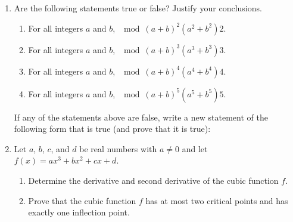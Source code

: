 \begin{enumerate}
\item Are the following statements true or false?  Justify your conclusions.
\begin{enumerate}
  \item For all integers $a$ and $b$, $\mod{(a + b)^2}{\left(a^2 + b^2 \right)}{2}$.
  \item For all integers $a$ and $b$, $\mod{(a + b)^3}{\left(a^3 + b^3 \right)}{3}$.
  \item For all integers $a$ and $b$, $\mod{(a + b)^4}{\left(a^4 + b^4 \right)}{4}$.
  \item For all integers $a$ and $b$, $\mod{(a + b)^5}{\left(a^5 + b^5 \right)}{5}$.
\end{enumerate}
If any of the statements above are false, write a new statement of the following form that is true (and prove that it is true):


\item Let $a$, $b$, $c$, and  $d$  be real numbers with $a \ne 0$ and let 
$f \left( x \right) = ax^3 + bx^2 + cx + d$.

\begin{enumerate}
\item Determine the derivative and second derivative of the cubic function $f$.

\item Prove that the cubic function $f$ has at  most two critical points and has exactly one inflection point.
\end{enumerate}

\end{enumerate}


